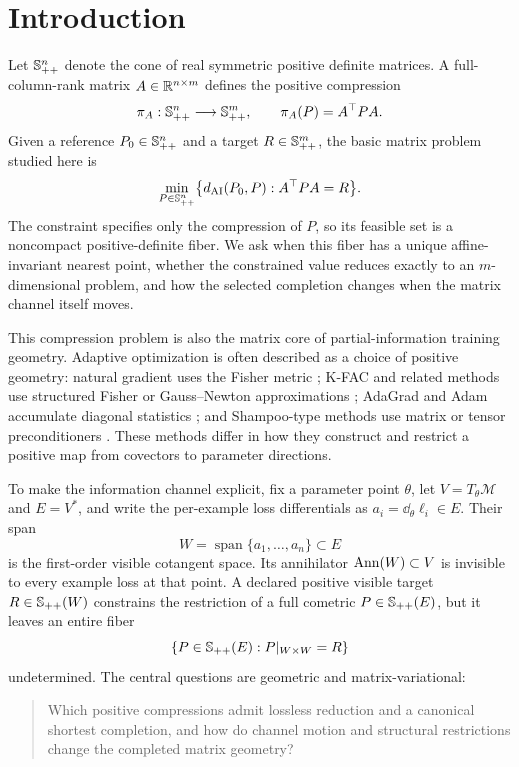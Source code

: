\section{Introduction}
\label{sec:introduction}

Let \(\mathbb S_{++}^n\) denote the cone of real symmetric positive definite matrices.
A full-column-rank matrix \(A\in\mathbb R^{n\times m}\) defines the positive
compression
\[
  \pi_A:\mathbb S_{++}^n\longrightarrow\mathbb S_{++}^m,
  \qquad
  \pi_A(P)=A^\top P A.
\]
Given a reference \(P_0\in\mathbb S_{++}^n\) and a target \(R\in\mathbb S_{++}^m\), the basic
matrix problem studied here is
\begin{equation}
  \min_{P\in\mathbb S_{++}^n}
  \bigl\{d_{\mathrm{AI}}(P_0,P):A^\top P A=R\bigr\}.
  \label{eq:intro-nearest-completion}
\end{equation}
The constraint specifies only the compression of \(P\), so its feasible set
is a noncompact positive-definite fiber.  We ask when this fiber has a unique
affine-invariant nearest point, whether the constrained value reduces exactly
to an \(m\)-dimensional problem, and how the selected completion changes when
the matrix channel itself moves.

This compression problem is also the matrix core of partial-information
training geometry.  Adaptive optimization is often described as a choice of
positive geometry: natural gradient uses the Fisher metric
\citep{amari1998natural}; K-FAC and related methods use structured Fisher or
Gauss--Newton approximations \citep{martens2015kfac,george2018ekfac}; AdaGrad
and Adam accumulate diagonal statistics
\citep{duchi2011adagrad,kingma2014adam}; and Shampoo-type methods use matrix or
tensor preconditioners \citep{gupta2018shampoo,morwani2024shampoo}.  These
methods differ in how they construct and restrict a positive map from
covectors to parameter directions.

To make the information channel explicit, fix a parameter point \(\theta\),
let \(V=T_\theta\mathcal M\) and \(E=V^*\), and write the per-example loss
differentials as \(a_i=\dd_\theta\ell_i\in E\).  Their span
\[
  W=\operatorname{span}\{a_1,\ldots,a_n\}\subset E
\]
is the first-order visible cotangent space.  Its annihilator
\(\operatorname{Ann}(W)\subset V\) is invisible to every example loss at that point.  A
declared positive visible target \(R\in\mathbb S_{++}(W)\) constrains the restriction of
a full cometric \(P\in\mathbb S_{++}(E)\), but it leaves an entire fiber
\[
  \{P\in\mathbb S_{++}(E):P|_{W\times W}=R\}
\]
undetermined.  The central questions are geometric and matrix-variational:

\begin{quote}
Which positive compressions admit lossless reduction and a canonical shortest
completion, and how do channel motion and structural restrictions change the
completed matrix geometry?
\end{quote}

